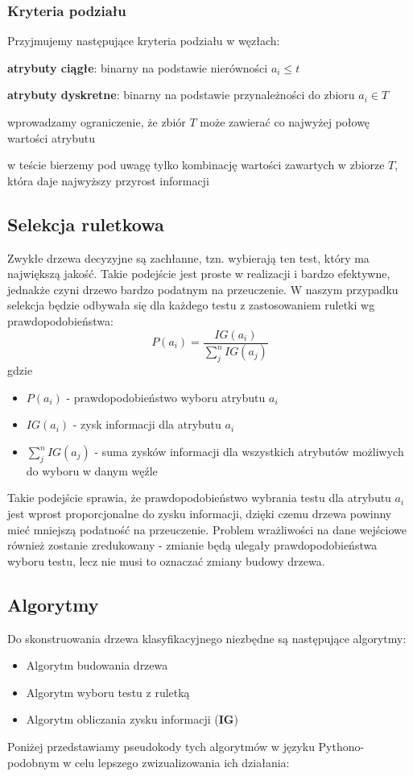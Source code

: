 \documentclass[11pt]{article}
\newcommand{\SubItem}[1]{
    {\setlength\itemindent{15pt} \item[•] #1}
}
\begin{document}
\subsubsection{Kryteria podziału}
Przyjmujemy następujące kryteria podziału w węzłach:
\begin{itemize}
\item\textbf{atrybuty ciągłe}: binarny na podstawie nierówności $a_i \le t$
\item \textbf{atrybuty dyskretne}: binarny na podstawie przynależności do zbioru $a_i \in T$
    \SubItem{wprowadzamy ograniczenie, że zbiór $T$ może zawierać co najwyżej połowę wartości atrybutu}
    \SubItem{w teście bierzemy pod uwagę tylko kombinację wartości zawartych w zbiorze $T$, która daje najwyższy przyrost informacji}
\end{itemize}

\newpage
\subsection{Selekcja ruletkowa}
\label{sec:org67ac858}
Zwykłe drzewa decyzyjne są zachłanne, tzn. wybierają ten test, który ma największą jakość. Takie podejście jest proste w realizacji i bardzo efektywne, jednakże czyni drzewo bardzo podatnym na przeuczenie. W naszym przypadku selekcja będzie odbywała się dla każdego testu z zastosowaniem ruletki wg prawdopodobieństwa:
$$
        P(a_i) = \frac{IG(a_i)}{\sum_j^n{IG(a_j)}}
$$
gdzie
\begin{itemize}
\item $P(a_i)$ - prawdopodobieństwo wyboru atrybutu $a_i$
\item $IG(a_i)$ - zysk informacji dla atrybutu $a_i$
\item $\sum_j^n{IG(a_j)}$ - suma zysków informacji dla wszystkich atrybutów możliwych do wyboru w danym węźle
\end{itemize}
Takie podejście sprawia, że prawdopodobieństwo wybrania testu dla atrybutu $a_i$ jest wprost proporcjonalne do zysku informacji, dzięki czemu drzewa powinny mieć mniejszą podatność na przeuczenie. Problem wrażliwości na dane wejściowe również zostanie zredukowany - zmianie będą ulegały prawdopodobieństwa wyboru testu, lecz nie musi to oznaczać zmiany budowy drzewa.
\subsection{Algorytmy}
\label{sec:org4909e92}
Do skonstruowania drzewa klasyfikacyjnego niezbędne są następujące algorytmy:
\begin{itemize}
\item Algorytm budowania drzewa
\item Algorytm wyboru testu z ruletką
\item Algorytm obliczania zysku informacji (\textbf{IG})
\end{itemize}
Poniżej przedstawiamy pseudokody tych algorytmów w języku Pythono-podobnym w celu lepszego zwizualizowania ich działania:
\end{document}
